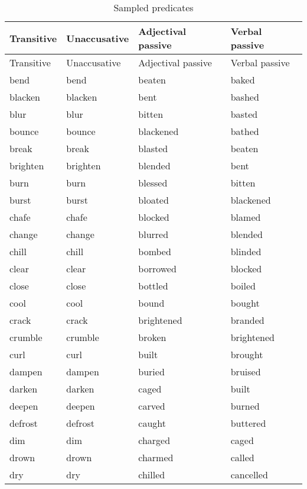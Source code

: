 \documentclass[output=paper]{langsci/langscibook}
\begin{document}
\label{app-14:a}
\largerpage
{\small
\begin{longtable}{ *{4}{>{\raggedright\arraybackslash}p{}} }
\caption{Sampled predicates}\\
\lsptoprule Transitive  & Unaccusative & Adjectival passive & Verbal passive\\\midrule\endfirsthead
\midrule Transitive  & Unaccusative & Adjectival passive & Verbal passive\\\midrule\endhead
\endfoot\lspbottomrule\endlastfoot
bend      & bend      & beaten     & baked\\
blacken   & blacken   & bent       & bashed\\
blur      & blur      & bitten     & basted\\
bounce    & bounce    & blackened  & bathed\\
break     & break     & blasted    & beaten\\
brighten  & brighten  & blended    & bent\\
burn      & burn      & blessed    & bitten \\
burst     & burst     & bloated    & blackened\\
chafe     & chafe     & blocked    & blamed\\
change    & change    & blurred    & blended\\
chill     & chill     & bombed     & blinded\\
clear     & clear     & borrowed   & blocked\\
close     & close     & bottled    & boiled\\
cool      & cool      & bound      & bought\\
crack     & crack     & brightened & branded\\
crumble   & crumble   & broken     & brightened\\
curl      & curl      & built      & brought\\
dampen    & dampen    & buried     & bruised\\
darken    & darken    & caged      & built \\
deepen    & deepen    & carved     & burned\\
defrost   & defrost   & caught     & buttered\\
dim       & dim       & charged    & caged\\
drown     & drown     & charmed    & called\\
dry       & dry       & chilled    & cancelled \\

\end{longtable}}
\end{document}
